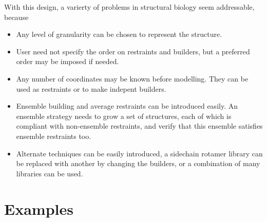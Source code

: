 \documentclass{article}[14pts]
\begin{document}
With this design, a varierty of problems in structural biology seem addressable, because
\begin{itemize}
\item Any level of granularity can be chosen to represent the structure.
\item User need not specify the order on restraints and builders, but a preferred order may be imposed if needed.
\item Any number of coordinates may be known before modelling. They can be used as restraints or to make indepent builders.
\item Ensemble building and average restraints can be introduced easily. An ensemble strategy needs to grow a set of structures, each of which is compliant with non-ensemble restraints, and verify that this ensemble satisfies ensemble restraints too.
\item Alternate techniques can be easily introduced, \eg a sidechain rotamer library can be replaced with another by changing the builders, or a combination of many libraries can be used.
\end{itemize}

\section{Examples}
\end{document}
